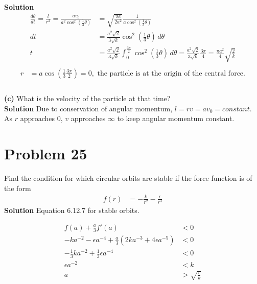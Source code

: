 \documentclass[]{article}
\newcommand{\bd}{\textbf}
\begin{document}
	\bd{Solution}
	\begin{equation}
		\begin{split}
			\frac{d\theta}{dt} = \frac{l}{r^2} = \frac{av_0}{a^2 \cos^2 (\frac{1}{3} \theta)} &= \sqrt{\frac{9k}{2a^2}} \frac{1}{a \cos^2 (\frac{1}{3} \theta)} \\
			dt &= \frac{a^2\sqrt{2}}{3\sqrt{k}} \cos^2 (\frac{1}{3} \theta) \, d\theta \\
			t &= \frac{a^2\sqrt{2}}{3\sqrt{k}} \int_{0}^{\frac{3\pi}{2}} \cos^2 (\frac{1}{3} \theta) \, d\theta = \frac{a^2\sqrt{2}}{3\sqrt{k}} \frac{3\pi}{4} = \frac{\pi a^2}{4} \sqrt{\frac{2}{k}} \\
		\end{split}
	\end{equation}
	\begin{equation}
		\begin{split}
			r &= a \cos (\frac{1}{3} \frac{3\pi}{2}) = 0, \text{ the particle is at the origin of the central force.} \\
		\end{split}
	\end{equation}
	\\
	\bd{(c)} What is the velocity of the particle at that time? \\
	
	\bd{Solution} Due to conservation of angular momentum, $ l = rv = av_0 = constant $. As $r$ approaches 0, $v$ approaches $\infty$ to keep angular momentum constant.
	

	\section{Problem 25}
	
	Find the condition for which circular orbits are stable if the force function is of the form
	\begin{equation}
		\begin{split}
			f(r) &= -\frac{k}{r^2} - \frac{\epsilon}{r^4} 
		\end{split}
	\end{equation} 
	\bd{Solution} Equation 6.12.7 for stable orbits.
	
	\begin{equation}
		\begin{split}
			f(a) + \frac{a}{3}f'(a) &< 0 \\
			-ka^{-2} - \epsilon a^{-4} + \frac{a}{3}(2ka^{-3} + 4\epsilon a^{-5}) &< 0 \\
			-\frac{1}{3}ka^{-2} + \frac{1}{3}\epsilon a^{-4} &< 0 \\
			\epsilon a^{-2} &< k \\
			a &> \sqrt{\frac{\epsilon}{k}} \\
		\end{split}
	\end{equation}
		
\end{document}
